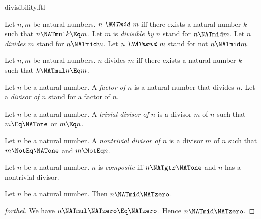 \documentclass{stex}
\begin{document}
\begin{smodule}{divisibility.ftl}

\begin{definition}[forthel,for={divisible,divide}]
  Let $n, m$ be natural numbers.
  $\emph{n \NATmid m}$ iff there exists a natural number $k$ such that $n \NATmul k \Eq m$.
  Let $m$ is \emph{divisible by $n$} stand for $n \NATmid m$.
  Let $n$ \emph{divides $m$} stand for $n \NATmid m$.
  Let $\emph{n \NATnmid m}$ stand for not $n \NATmid m$.
\end{definition}

\begin{lemma}[forthel]
  Let $n, m$ be natural numbers.
  $n$ divides $m$ iff there exists a natural number $k$ such that $k \NATmul n \Eq m$.
\end{lemma}

\begin{definition}[forthel,for={factor,divisor}]
  Let $n$ be a natural number.
  A \emph{factor of $n$} is a natural number that divides $n$.
  Let a \emph{divisor of $n$} stand for a factor of $n$.
\end{definition}

\begin{definition}[forthel,for=trivial divisor]
  Let $n$ be a natural number.
  A \emph{trivial divisor of $n$} is a divisor $m$ of $n$ such that $m \Eq \NATone$ or $m \Eq n$.
\end{definition}

\begin{definition}[forthel,for=nontrivial divisor]
  Let $n$ be a natural number.
  A \emph{nontrivial divisor of $n$} is a divisor $m$ of $n$ such that $m \NotEq \NATone$ and $m \NotEq n$.
\end{definition}

\begin{definition}[forthel]
  Let $n$ be a natural number.
  $n$ is \emph{composite} iff $n \NATgtr \NATone$ and $n$ has a nontrivial divisor.
\end{definition}

\begin{proposition}[forthel]
  Let $n$ be a natural number.
  Then $n \NATmid \NATzero$.
\end{proposition}
\begin{proof}[forthel]
  We have $n \NATmul \NATzero \Eq \NATzero$.
  Hence $n \NATmid \NATzero$.
\end{proof}


\end{smodule}
\end{document}
